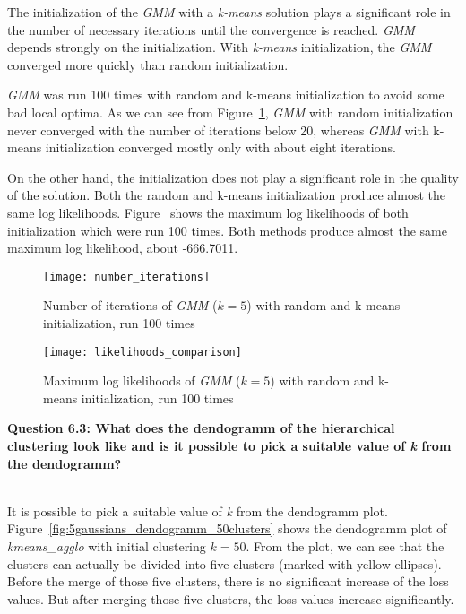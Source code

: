The initialization of the \textit{GMM} with a \textit{k-means} solution plays a significant role in the number of necessary iterations until the convergence is reached. \textit{GMM} depends strongly on the initialization. With \textit{k-means} initialization, the \textit{GMM} converged more quickly than random initialization.

\textit{GMM} was run 100 times with random and k-means initialization to avoid some bad local optima. As we can see from Figure~\ref{fig:number_iterations}, \textit{GMM} with random initialization never converged with the number of iterations below 20, whereas \textit{GMM} with k-means initialization converged mostly only with about eight iterations.

On the other hand, the initialization does not play a significant role in the quality of the solution. Both the random and k-means initialization produce almost the same log likelihoods. Figure~ shows the maximum log likelihoods of both initialization which were run 100 times. Both methods produce almost the same maximum log likelihood, about -666.7011.

\begin{figure}[h!]
	\centering
	\texttt{[image: number\_iterations]}
	\caption{Number of iterations of \textit{GMM} ($k=5$) with random and k-means initialization, run 100 times}
	\label{fig:number_iterations}
\end{figure}

\begin{figure}[h!]
	\centering
	\texttt{[image: likelihoods\_comparison]}
	\caption{Maximum log likelihoods of \textit{GMM} ($k=5$) with random and k-means initialization, run 100 times}
	\label{fig:likelihoods_comparison}
\end{figure}


{\raggedright \textbf{Question 6.3: What does the dendogramm of the hierarchical clustering look like and is it possible to pick a suitable value of \textit{k} from the dendogramm?}}\\

It is possible to pick a suitable value of \textit{k} from the dendogramm plot. Figure~\ref{fig:5gaussians_dendogramm_50clusters} shows the dendogramm plot of \textit{kmeans\_agglo} with initial clustering $k=50$. From the plot, we can see that the clusters can actually be divided into five clusters (marked with yellow ellipses). Before the merge of those five clusters, there is no significant increase of the loss values. But after merging those five clusters, the loss values increase significantly.


